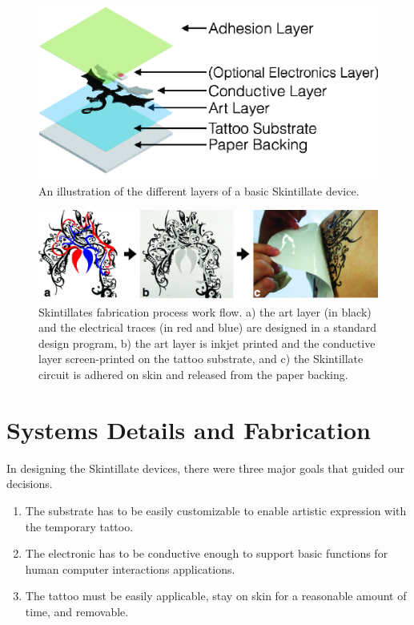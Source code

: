 \documentclass{sigchi}
\begin{document}
\begin{figure}[h]
\centering
\includegraphics[width=0.9\columnwidth]{figures/Figure4}
\caption{An illustration of the different layers of a basic Skintillate device.}
\vspace{-8pt}
\label{fig:layers}
\end{figure}
\begin{figure} [!ht]
\centering
\includegraphics[width=1.0\textwidth]{figures/Figure3}
\caption{Skintillates fabrication process work flow. a) the art layer (in black) and the electrical traces (in red and blue) are designed in a standard design program, b) the art layer is inkjet printed and the conductive layer screen-printed on the tattoo substrate, and c) the Skintillate circuit is adhered on skin and released from  the paper backing.}
\vspace{-8pt}
\label{fig:applicationprocess}
\end{figure}

\section{Systems Details and Fabrication}
 In designing the Skintillate devices, there were three major goals that guided our decisions. 

\begin{enumerate}
  \item The substrate has to be easily customizable to enable artistic expression with the temporary tattoo.
  \item The electronic has to be conductive enough to support basic functions for human computer interactions applications. 
  \item The tattoo must be easily applicable, stay on skin for a reasonable amount of time, and removable.
\end{enumerate}
\end{document}

